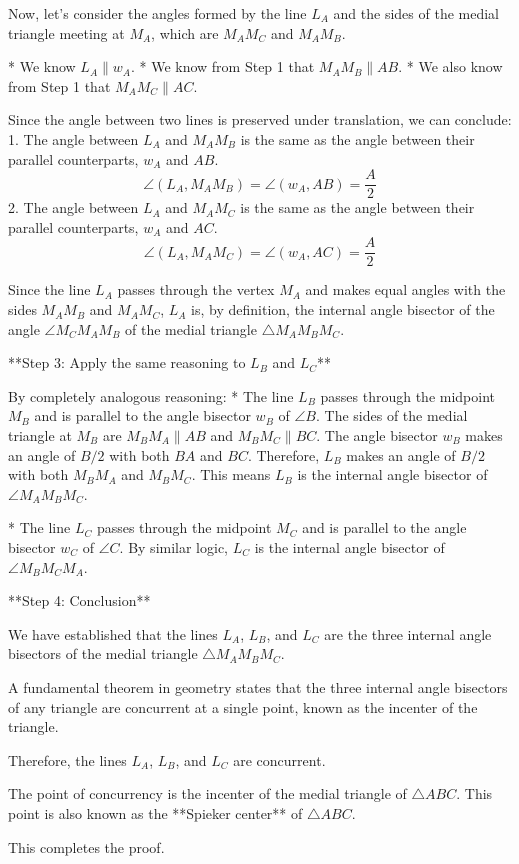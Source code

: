 Now, let's consider the angles formed by the line $L_A$ and the sides of the medial triangle meeting at $M_A$, which are $M_A M_C$ and $M_A M_B$.

*   We know $L_A \parallel w_A$.
*   We know from Step 1 that $M_A M_B \parallel AB$.
*   We also know from Step 1 that $M_A M_C \parallel AC$.

Since the angle between two lines is preserved under translation, we can conclude:
1.  The angle between $L_A$ and $M_A M_B$ is the same as the angle between their parallel counterparts, $w_A$ and $AB$.
    $$ \angle(L_A, M_A M_B) = \angle(w_A, AB) = \frac{A}{2} $$
2.  The angle between $L_A$ and $M_A M_C$ is the same as the angle between their parallel counterparts, $w_A$ and $AC$.
    $$ \angle(L_A, M_A M_C) = \angle(w_A, AC) = \frac{A}{2} $$

Since the line $L_A$ passes through the vertex $M_A$ and makes equal angles with the sides $M_A M_B$ and $M_A M_C$, $L_A$ is, by definition, the internal angle bisector of the angle $\angle M_C M_A M_B$ of the medial triangle $\triangle M_A M_B M_C$.

**Step 3: Apply the same reasoning to $L_B$ and $L_C$**

By completely analogous reasoning:
*   The line $L_B$ passes through the midpoint $M_B$ and is parallel to the angle bisector $w_B$ of $\angle B$. The sides of the medial triangle at $M_B$ are $M_B M_A \parallel AB$ and $M_B M_C \parallel BC$. The angle bisector $w_B$ makes an angle of $B/2$ with both $BA$ and $BC$. Therefore, $L_B$ makes an angle of $B/2$ with both $M_B M_A$ and $M_B M_C$. This means $L_B$ is the internal angle bisector of $\angle M_A M_B M_C$.

*   The line $L_C$ passes through the midpoint $M_C$ and is parallel to the angle bisector $w_C$ of $\angle C$. By similar logic, $L_C$ is the internal angle bisector of $\angle M_B M_C M_A$.

**Step 4: Conclusion**

We have established that the lines $L_A$, $L_B$, and $L_C$ are the three internal angle bisectors of the medial triangle $\triangle M_A M_B M_C$.

A fundamental theorem in geometry states that the three internal angle bisectors of any triangle are concurrent at a single point, known as the incenter of the triangle.

Therefore, the lines $L_A$, $L_B$, and $L_C$ are concurrent.

The point of concurrency is the incenter of the medial triangle of $\triangle ABC$. This point is also known as the **Spieker center** of $\triangle ABC$.

This completes the proof.